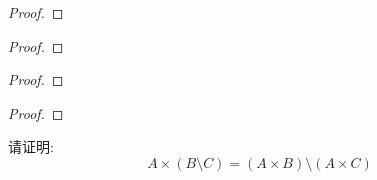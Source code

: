 \documentclass[a4paper, justified]{tufte-handout}
\begin{document}
\begin{problem}[UD Problem 7.20]
\end{problem}

\begin{proof}
\end{proof}

\begin{problem}[UD Problem 8.1 (a, b)]
\end{problem}

\begin{solution}
\end{solution}

\begin{problem}[UD Problem 8.14]
\end{problem}

\begin{solution}
\end{solution}

\begin{problem}[UD Problem 8.15]
\end{problem}

\begin{solution}
\end{solution}

\begin{problem}[UD Problem 9.8]
\end{problem}

\begin{proof}
\end{proof}

\begin{problem}[UD Problem 9.9]
\end{problem}

\begin{proof}
\end{proof}

\begin{problem}[UD Problem 9.10]
\end{problem}

\begin{proof}
\end{proof}

\begin{problem}
  请证明: 
  \[
    A \times (B \setminus C) = (A \times B) \setminus (A \times C)
  \]
\end{problem}
\end{document}
